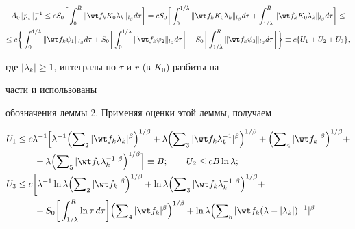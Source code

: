 {\begin{multline}
A_0\|p_1\|^{-1}_s\le c S_0\biggl[\,\int^R_0


\|\wt f_k K_0\lambda_k\|_{l_\beta}d\tau\biggr]=


c S_0\biggl[\,\int^{1/\lambda}_0\|\wt f_k K_0\lambda_k\|_{l_\beta}


d\tau+\int^R_{1/\lambda}\|\wt f_k K_0\lambda_k\|_{l_\beta}d\tau


\biggr]\le \\


\le c\biggl\{\,\int^{1/\lambda}_0\|\wt f_k\psi_1\|_{l_\beta}d\tau+


S_0\biggl[\,\int^{1/\lambda}_0\|\wt f_k\psi_2\|_{l_\beta}d\tau


\biggr]+S_0\biggl[\,\int^R_{1/\lambda}\|\wt f_k\psi_3\|_{l_\beta}


d\tau\biggr]\biggr\}\equiv c\{U_1+U_2+U_3\},


\end{multline}


где $|\lambda_k|\ge 1$, интегралы по $\tau$ и $r$ (в $K_0$) разбиты на 


части и использованы


обозначения леммы 2. Применяя оценки этой леммы, получаем


\begin{align*}


U_1&\le c\lambda^{-1}\Bigl[\lambda^{-1}\Bigl(\sumn_2


|\wt f_k\lambda_k|^\beta\Bigr)^{1/\beta}+\lambda\Bigl(


\sumn_3|\wt f_k\lambda^{-1}_k|^\beta\Bigr)^{1/\beta}+


\Bigl(\sumn_4|\wt f_k|^\beta\Bigr)^{1/\beta}+ \\


&\qquad +\lambda\Bigl(\sumn_5|\wt f_k\lambda^{-1}_k|^\beta


\Bigr)^{1/\beta}\Bigr]\equiv B;\qquad U_2\le c B\ln\lambda; \\


U_3&\le c\biggl[\lambda^{-1}\ln\lambda\Bigl(\sumn_2


|\wt f_k|^\beta\Bigr)^{1/\beta}+\ln\lambda\Bigl(\sumn_3


|\wt f_k\lambda^{-1}_k|^\beta\Bigr)^{1/\beta}+ \\


&\qquad +S_0\biggl[\,\int^R_{1/\lambda}\ln\tau\,d\tau\biggr]


\Bigl(\sumn_4|\wt f_k|^\beta\Bigr)^{1/\beta}+\ln\lambda


\Bigl(\sumn_5|\wt f_k(\lambda-|\lambda_k|)^{-1}|^\beta



\end{align*}}
